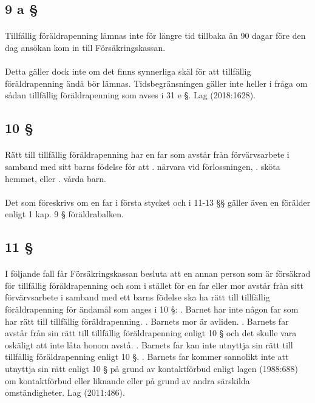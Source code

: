 \documentclass[a4paper,notitlepage,openany,10pt]{book}
\begin{document}
\subsection*{9 a §}
\paragraph*{}
Tillfällig föräldrapenning lämnas inte för längre tid tillbaka än 90 dagar före den dag ansökan kom in till Försäkringskassan.
\paragraph*{}
Detta gäller dock inte om det finns synnerliga skäl för att tillfällig föräldrapenning ändå bör lämnas. Tidsbegränsningen gäller inte heller i fråga om sådan tillfällig föräldrapenning som avses i 31 e §.
Lag (2018:1628).
\subsection*{10 §}
\paragraph*{}
Rätt till tillfällig föräldrapenning har en far som avstår från förvärvsarbete i samband med sitt barns födelse för att
. närvara vid förlossningen,
. sköta hemmet, eller
. vårda barn.
\paragraph*{}
Det som föreskrivs om en far i första stycket och i 11-13 §§ gäller även en förälder enligt 1 kap. 9 § föräldrabalken.
\subsection*{11 §}
\paragraph*{}
I följande fall får Försäkringskassan besluta att en annan person som är försäkrad för tillfällig föräldrapenning och som i stället för en far eller mor avstår från sitt förvärvsarbete i samband med ett barns födelse ska ha rätt till tillfällig föräldrapenning för ändamål som anges i 10 §:
. Barnet har inte någon far som har rätt till tillfällig föräldrapenning.
. Barnets mor är avliden.
. Barnets far avstår från sin rätt till tillfällig föräldrapenning enligt 10 § och det skulle vara oskäligt att inte låta honom avstå.
. Barnets far kan inte utnyttja sin rätt till tillfällig föräldrapenning enligt 10 §.
. Barnets far kommer sannolikt inte att utnyttja sin rätt enligt 10 § på grund av kontaktförbud enligt lagen (1988:688) om kontaktförbud eller liknande eller på grund av andra särskilda omständigheter.
Lag (2011:486).
\end{document}
